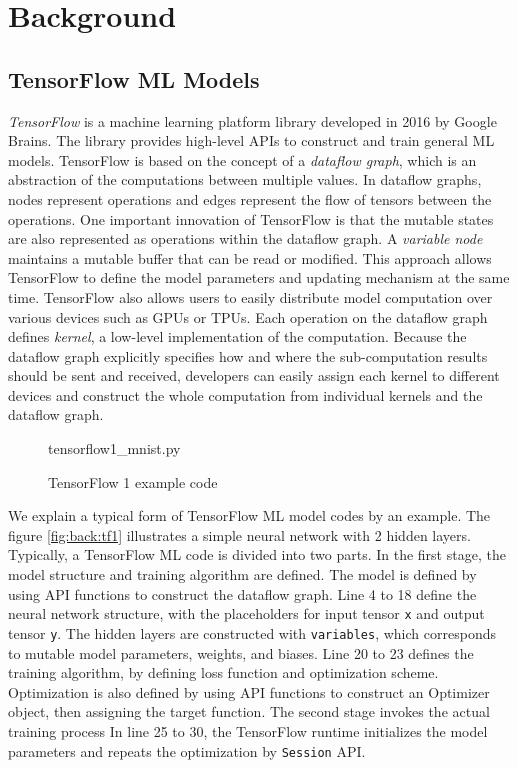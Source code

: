 \section{Background}\label{sec:background}
\subsection{TensorFlow ML Models}

\textit{TensorFlow}\cite{tensorflow} is a machine learning platform library
developed in 2016 by Google Brains.
The library provides high-level APIs to construct and train general ML models.
TensorFlow is based on the concept of a \textit{dataflow graph},
which is an abstraction of the computations between
multiple values.
In dataflow graphs, nodes represent operations and
edges represent the flow of tensors between the operations.
One important innovation of TensorFlow
is that the mutable states are also represented as operations
within the dataflow graph. 
A \textit{variable node} maintains a mutable buffer that can be read or modified.
This approach allows TensorFlow to define the model parameters
and updating mechanism at the same time.
TensorFlow also allows users to easily distribute model computation over
various devices such as GPUs or TPUs.
Each operation on the dataflow graph defines \textit{kernel},
a low-level implementation of the computation.
Because the dataflow graph explicitly specifies how
and where the sub-computation results should be sent and received,
developers can easily assign each kernel to different devices and construct
the whole computation from individual kernels and the dataflow graph.

\begin{figure}

{tensorflow1_mnist.py}
\caption{TensorFlow 1 example code}
\label{fig:bac:tf1}
\end{figure}

We explain a typical form of TensorFlow ML model codes by an example.
The figure \ref{fig:back:tf1} illustrates a simple neural network with 2 hidden layers.
Typically, a TensorFlow ML code is divided into two parts.
In the first stage, the model structure and training algorithm are defined.
The model is defined by using API functions to construct the dataflow graph.
Line 4 to 18 define the neural network structure,
with the placeholders for input tensor {\tt x} and output tensor {\tt y}.
The hidden layers are constructed with {\tt variables},
which corresponds to mutable model parameters, weights, and biases.  
Line 20 to 23 defines the training algorithm, 
by defining loss function and optimization scheme.
Optimization is also defined by using API functions to construct
an Optimizer object, then assigning the target function.
The second stage invokes the actual training process
In line 25 to 30, the TensorFlow runtime initializes the model parameters
and repeats the optimization by {\tt Session} API. 


